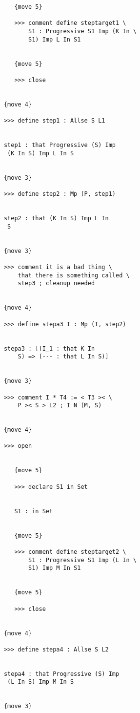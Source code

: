 \documentclass{article}
\begin{document}
\begin{verbatim}
               {move 5}

               >>> comment define steptarget1 \
                   S1 : Progressive S1 Imp (K In \
                   S1) Imp L In S1


               {move 5}

               >>> close


            {move 4}

            >>> define step1 : Allse S L1


            step1 : that Progressive (S) Imp 
             (K In S) Imp L In S


            {move 3}

            >>> define step2 : Mp (P, step1)


            step2 : that (K In S) Imp L In 
             S


            {move 3}

            >>> comment it is a bad thing \
                that there is something called \
                step3 ; cleanup needed


            {move 4}

            >>> define stepa3 I : Mp (I, step2)


            stepa3 : [(I_1 : that K In 
                S) => (--- : that L In S)]


            {move 3}

            >>> comment I * T4 := < T3 >< \
                P >< S > L2 ; I N (M, S)


            {move 4}

            >>> open


               {move 5}

               >>> declare S1 in Set


               S1 : in Set


               {move 5}

               >>> comment define steptarget2 \
                   S1 : Progressive S1 Imp (L In \
                   S1) Imp M In S1


               {move 5}

               >>> close


            {move 4}

            >>> define stepa4 : Allse S L2


            stepa4 : that Progressive (S) Imp 
             (L In S) Imp M In S


            {move 3}


\end{verbatim}
\end{document}

